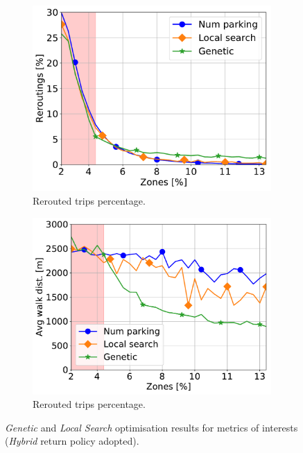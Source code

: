 \begin{figure}[t!]
\begin{center}
		\begin{subfigure}{0.49\textwidth}
			\includegraphics[width=\columnwidth]{figures/Hybrid_ReroutePerc.pdf}
			\caption{Rerouted trips percentage.}
			\label{fig:7_7a_reroute}
		\end{subfigure}
		\begin{subfigure}{0.49\textwidth}
			\includegraphics[width=\columnwidth]{figures/Hybrid_AvgWalkedDistance.pdf}
			\caption{Rerouted trips percentage.}
			\label{fig:7_7a_awd}
		\end{subfigure}         
    \caption{\textit{Genetic} and \textit{Local Search} optimisation results for metrics of interests (\textit{Hybrid} return policy adopted).}
	\label{fig:7_7a_hybrid_optimization}
	\end{center}
\end{figure}


